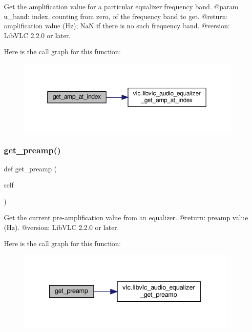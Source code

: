 \begin{DoxyVerb}Get the amplification value for a particular equalizer frequency band.
@param u_band: index, counting from zero, of the frequency band to get.
@return: amplification value (Hz); NaN if there is no such frequency band.
@version: LibVLC 2.2.0 or later.
\end{DoxyVerb}
 Here is the call graph for this function\+:
\nopagebreak
\begin{figure}[H]
\begin{center}
\leavevmode
\includegraphics[width=340pt]{classvlc_1_1_audio_equalizer_a6e57bd49d3e905307ae97d8f1398b72f_cgraph}
\end{center}
\end{figure}
\mbox{\label{classvlc_1_1_audio_equalizer_ae95fe34603e8e5b5a646e309fb38f324}} 
\subsubsection{\texorpdfstring{get\+\_\+preamp()}{get\_preamp()}}
{\footnotesize\ttfamily def get\+\_\+preamp (\begin{DoxyParamCaption}\item[{}]{self }\end{DoxyParamCaption})}

\begin{DoxyVerb}Get the current pre-amplification value from an equalizer.
@return: preamp value (Hz).
@version: LibVLC 2.2.0 or later.
\end{DoxyVerb}
 Here is the call graph for this function\+:
\nopagebreak
\begin{figure}[H]
\begin{center}
\leavevmode
\includegraphics[width=312pt]{classvlc_1_1_audio_equalizer_ae95fe34603e8e5b5a646e309fb38f324_cgraph}
\end{center}
\end{figure}
\mbox{\label{classvlc_1_1_audio_equalizer_a4cd51e19135e5ad4a19eae3ea9c60537}} 
